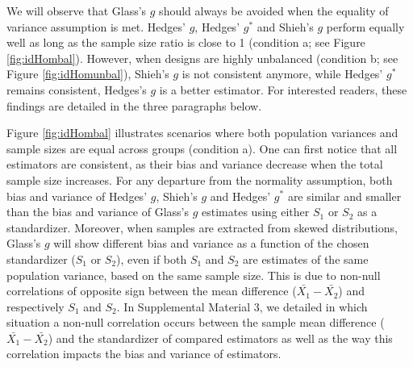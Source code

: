 \documentclass[
  12pt,
  french,
]{article}
\begin{document}
We will observe that Glass's \(g\) should always be avoided when the
equality of variance assumption is met. Hedges' \(g\), Hedges' \(g^*\)
and Shieh's \(g\) perform equally well as long as the sample size ratio
is close to 1 (condition a; see Figure \ref{fig:idHombal}). However,
when designs are highly unbalanced (condition b; see Figure
\ref{fig:idHomunbal}), Shieh's \(g\) is not consistent anymore, while
Hedges' \(g^*\) remains consistent, Hedges's \(g\) is a better
estimator. For interested readers, these findings are detailed in the
three paragraphs below.

\newpage

Figure \ref{fig:idHombal} illustrates scenarios where both population
variances and sample sizes are equal across groups (condition a). One
can first notice that all estimators are consistent, as their bias and
variance decrease when the total sample size increases. For any
departure from the normality assumption, both bias and variance of
Hedges' \(g\), Shieh's \(g\) and Hedges' \(g^*\) are
similar
and smaller than the bias and variance of Glass's \(g\) estimates using
either \(S_1\) or \(S_2\) as a standardizer. Moreover, when samples are
extracted from skewed distributions, Glass's \(g\) will show different
bias and variance as a function of the chosen standardizer (\(S_1\) or
\(S_2\)), even if both \(S_1\) and \(S_2\) are estimates of the same
population variance, based on the same sample size. This is due to
non-null correlations of opposite sign between the mean difference
(\(\bar{X_1}-\bar{X_2}\)) and respectively \(S_1\) and \(S_2\). In
Supplemental Material 3, we detailed in which situation a non-null
correlation occurs between the sample mean difference
(\(\bar{X_1}-\bar{X_2}\)) and the standardizer of compared estimators as
well as the way this correlation impacts the bias and variance of
estimators.
\end{document}
